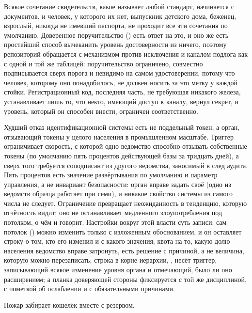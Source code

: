 \begin{description}
    Всякое сочетание свидетельств, какое называет любой стандарт, начинается с документов, и
    человек, у которого их нет, выпускник детского дома, беженец, взрослый, никогда не имевший
    паспорта, не проходит все эти сочетания по умолчанию. Доверенное поручительство
    () есть ответ на это, и оно же есть простейший способ вычеканить
    уровень достоверности из ничего, поэтому репозиторий обращается с механизмом против
    исключения и каналом подлога как с одной и той же таблицей: поручительство ограничено,
    совместно подписывается сверх порога и невидимо на самом удостоверении, потому что человек,
    которому оно понадобилось, не должен носить за это метку у каждой стойки. Регистрационный
    код, последняя часть, не требующая никакого железа, устанавливает лишь то, что некто,
    имеющий доступ к каналу, вернул секрет, и уровень, который он способен внести, ограничен
    соответственно. \sImpl
  \item[Выход: усмотрение эмитента как решение, переживающее собственное изменение.] Худший отказ
    идентификационной системы есть не поддельный токен, а орган, отзывающий токены у целого
    населения в промышленном масштабе. Триггер ограничивает скорость, с которой одно ведомство
    способно отзывать собственные токены (по умолчанию пять процентов действующей базы за
    тридцать дней), а сверх того требуется соподписант из другого ведомства, заносимый в след
    аудита. Пять процентов есть значение развёртывания по умолчанию и параметр управления, а не
    инвариант безопасности: орган вправе задать своё (одно из ведомств образца работает при семи), и
    никакое свойство системы из самого числа не следует. Ограничение превращает неожиданность в тенденцию, которую отчётность видит; оно не
    останавливает медленного злоупотребления под потолком, о чём и говорит. Настройки вокруг
    этой власти суть записи: сам потолок ()
    можно изменить только с изложенным обоснованием, и он оставляет строку о том, кто его изменил
    и с какого значения; квота на то, какую долю населения ведомство вправе затронуть, есть
    решение с причиной, а не величина, которую можно перезаписать; строка в корне иерархии,
    , несёт триггер, записывающий всякое изменение уровня органа и отмечающий, было
    ли оно расширением; а планка доверяющей стороны фиксируется с той же дисциплиной, с пометкой об ослаблении и с
    обязательными причинами. \sImpl
  \item[Возвращение: обряд восстановления.] Пожар забирает кошелёк вместе с резервом.

\end{description}
